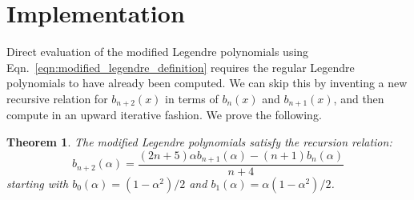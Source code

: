\documentclass{article}
\theoremstyle{plain}
\newtheorem{theorem}{Theorem}
\begin{document}
    \section{Implementation}
        Direct evaluation of the modified Legendre polynomials using
        Eqn.~\ref{eqn:modified_legendre_definition}
        requires the regular Legendre polynomials to have already been
        computed. We can skip this by inventing a new recursive relation
        for $b_{n+2}(x)$ in terms of $b_{n}(x)$ and $b_{n+1}(x)$, and then
        compute in an upward iterative fashion. We prove the following.
        \begin{theorem}
            \label{thm:modified_legendre_recursion}
            The modified Legendre polynomials satisfy the recursion relation:
            \begin{equation}
                b_{n+2}(\alpha)=
                \frac{(2n+5)\alpha{b}_{n+1}(\alpha)-(n+1)b_{n}(\alpha)}{n+4}
            \end{equation}
            starting with $b_{0}(\alpha)=(1-\alpha^{2})/2$ and
            $b_{1}(\alpha)=\alpha(1-\alpha^{2})/2$.
        \end{theorem}
\end{document}
